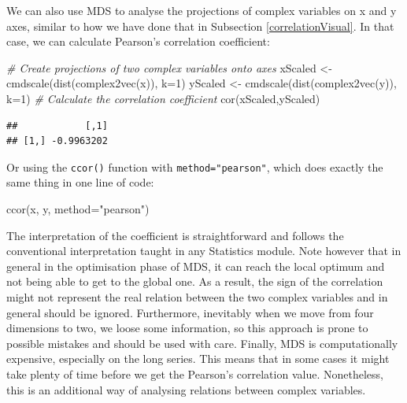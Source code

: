 \documentclass[
]{book}
\newenvironment{Shaded}{\begin{snugshade}}{\end{snugshade}}
\newcommand{\AttributeTok}[1]{\textcolor[rgb]{0.77,0.63,0.00}{#1}}
\newcommand{\CommentTok}[1]{\textcolor[rgb]{0.56,0.35,0.01}{\textit{#1}}}
\newcommand{\DecValTok}[1]{\textcolor[rgb]{0.00,0.00,0.81}{#1}}
\newcommand{\FunctionTok}[1]{\textcolor[rgb]{0.00,0.00,0.00}{#1}}
\newcommand{\NormalTok}[1]{#1}
\newcommand{\OtherTok}[1]{\textcolor[rgb]{0.56,0.35,0.01}{#1}}
\newcommand{\StringTok}[1]{\textcolor[rgb]{0.31,0.60,0.02}{#1}}
\begin{document}
We can also use MDS to analyse the projections of complex variables on x and y axes, similar to how we have done that in Subsection \ref{correlationVisual}. In that case, we can calculate Pearson's correlation coefficient:

\begin{Shaded}
\begin{Highlighting}[]
\CommentTok{\# Create projections of two complex variables onto axes}
\NormalTok{xScaled }\OtherTok{\textless{}{-}} \FunctionTok{cmdscale}\NormalTok{(}\FunctionTok{dist}\NormalTok{(}\FunctionTok{complex2vec}\NormalTok{(x)), }\AttributeTok{k=}\DecValTok{1}\NormalTok{)}
\NormalTok{yScaled }\OtherTok{\textless{}{-}} \FunctionTok{cmdscale}\NormalTok{(}\FunctionTok{dist}\NormalTok{(}\FunctionTok{complex2vec}\NormalTok{(y)), }\AttributeTok{k=}\DecValTok{1}\NormalTok{)}
\CommentTok{\# Calculate the correlation coefficient}
\FunctionTok{cor}\NormalTok{(xScaled,yScaled)}
\end{Highlighting}
\end{Shaded}

\begin{verbatim}
##            [,1]
## [1,] -0.9963202
\end{verbatim}

Or using the \texttt{ccor()} function with \texttt{method="pearson"}, which does exactly the same thing in one line of code:

\begin{Shaded}
\begin{Highlighting}[]
\FunctionTok{ccor}\NormalTok{(x, y, }\AttributeTok{method=}\StringTok{"pearson"}\NormalTok{)}
\end{Highlighting}
\end{Shaded}

The interpretation of the coefficient is straightforward and follows the conventional interpretation taught in any Statistics module. Note however that in general in the optimisation phase of MDS, it can reach the local optimum and not being able to get to the global one. As a result, the sign of the correlation might not represent the real relation between the two complex variables and in general should be ignored. Furthermore, inevitably when we move from four dimensions to two, we loose some information, so this approach is prone to possible mistakes and should be used with care. Finally, MDS is computationally expensive, especially on the long series. This means that in some cases it might take plenty of time before we get the Pearson's correlation value. Nonetheless, this is an additional way of analysing relations between complex variables.
\end{document}
